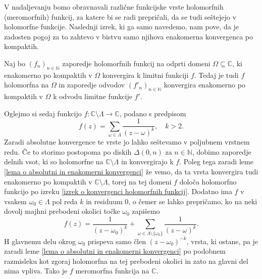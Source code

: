 \documentclass[mat1]{fmfdelo}
\numberwithin{equation}{section}
\newcommand{\N}{\mathbb N}
\newcommand{\C}{\mathbb C}
\newcommand{\om}{\omega}
\newcommand{\disk}[2]{\Delta(#1, #2)}
\theoremstyle{definition}
\begin{document}
V nadaljevanju bomo obravnavali različne funkcijske vrste holomorfnih (meromorfnih) funkcij, za katere bi se radi prepričali, da se tudi seštejejo v holomorfne funkcije. Naslednji izrek, ki ga samo navedemo, nam pove, da je zadosten pogoj za to zahtevo v bistvu samo njihova enakomerna konvergenca po kompaktih. 

\begin{izrek}
    \label{izrek o konvergenci holomorfnih funkcij}
    Naj bo $(f_n)_{n \in \N}$ zaporedje holomorfnih funkcij na odprti domeni $\Omega \subseteq \C$, ki enakomerno po kompaktih v $\Omega$ konvergira k limitni funkciji $f$. Tedaj je tudi $f$ holomorfna na $\Omega$ in zaporedje odvodov $(f'_n)_{n\in \N}$ konvergira enakomerno po kompaktih v $\Omega$ k odvodu limitne funkcije $f'$.
\end{izrek}
    
Oglejmo si sedaj funkcijo $f:\C\setminus\Lambda \to \C$, podano s predpisom
\[
    f(z) = \sum_{\om \in \Lambda} \frac{1}{(z - \om)^k}, \quad k > 2.
\]
Zaradi absolutne konvergence te vrste jo lahko seštevamo v poljubnem vrstnem redu. Če to storimo postopoma po diskih $\disk{0}{n}$ za $n\in\N$, dobimo zaporedje delnih vsot, ki so holomorfne na $\C\setminus\Lambda$ in konvergirajo k $f$. Poleg tega zaradi leme \ref{lema o absolutni in enakomerni konvergenci} že vemo, da ta vrsta konvergira tudi enakomerno po kompaktih v $\C\setminus\Lambda$, torej na tej domeni $f$ določa holomorfno funkcijo po izreku \ref{izrek o konvergenci holomorfnih funkcij}. Dodatno ima $f$ v vsakem $\om_0 \in \Lambda$ pol reda $k$ in residuum $0$, o čemer se lahko prepričamo, ko na neki dovolj majhni prebodeni okolici točke $\om_0$ zapišemo
\[
    f(z) = \frac{1}{(z-\om_0)^k} + \sum_{\om \in \Lambda \setminus \{\om_0\}} \frac{1}{(z - \om)^k}.
\]
H glavnemu delu okrog $\om_0$ prispeva samo člen $(z - \om_0)^{-k}$, vrsta, ki ostane, pa je zaradi leme \ref{lema o absolutni in enakomerni konvergenci} po podobnem razmisleku kot zgoraj holomorfna na tej prebodeni okolici in zato na glavni del nima vpliva. Tako je $f$ meromorfna funkcija na $\C$. 
\end{document}
